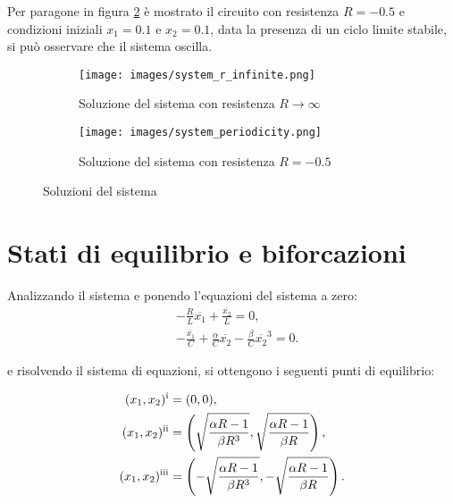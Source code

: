 \documentclass{article}
\newcommand{\rom}[1]{\uppercase\expandafter{\romannumeral #1\relax}}
\begin{document}
Per paragone in figura \ref{fig:oscillazione_circuito} è mostrato il circuito con resistenza \(R = -0.5\) e condizioni iniziali \(x_1 = 0.1\) e \(x_2 = 0.1\), data la presenza di un ciclo limite stabile, si può osservare che il sistema oscilla.

\begin{figure}[ht]
    \centering
    \begin{subfigure}{0.49\textwidth}
        \texttt{[image: images/system\_r\_infinite.png]}
        \caption{Soluzione del sistema con resistenza \(R \to \infty\)}
        \label{fig:soluzione_ode}
    \end{subfigure}
    \hfill
    \begin{subfigure}{0.49\textwidth}
        \texttt{[image: images/system\_periodicity.png]}
        \caption{Soluzione del sistema con resistenza \(R = -0.5\)}
        \label{fig:oscillazione_circuito}
    \end{subfigure}
    \caption{Soluzioni del sistema}
    \label{fig:soluzioni}
\end{figure}

\section{Stati di equilibrio e biforcazioni}

Analizzando il sistema e ponendo l'equazioni del sistema a zero:
\begin{align*}
     & -\frac{R}{L}\overline{x_1} + \frac{\overline{x_2}}{L} = 0,                                        \\
     & -\frac{\overline{x_1}}{C} + \frac{\alpha}{C}\overline{x_2} - \frac{\beta}{C}\overline{x_2}^3 = 0.
\end{align*}

e risolvendo il sistema di equazioni, si ottengono i seguenti punti di equilibrio:

\begin{align*}
    (x_1, x_2)^\text{\rom{1}} & = (0, 0),                                                                                    \\
    (x_1, x_2)^\text{\rom{2}} & = \left(\sqrt{\frac{\alpha R - 1}{\beta R^3}}, \sqrt{\frac{\alpha R - 1}{\beta R}}\right),   \\
    (x_1, x_2)^\text{\rom{3}} & = \left(-\sqrt{\frac{\alpha R - 1}{\beta R^3}}, -\sqrt{\frac{\alpha R - 1}{\beta R}}\right).
\end{align*}
\end{document}
